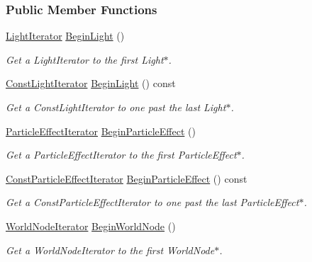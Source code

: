 \subsubsection*{Public Member Functions}
\begin{DoxyCompactItemize}
\item 
\hyperlink{classphys_1_1SceneManager_a2764b9082b4aecbf833c2f6e9f174ba0}{LightIterator} \hyperlink{classphys_1_1SceneManager_a710bed731b5674cae3bb09853f3a0cd1}{BeginLight} ()
\begin{DoxyCompactList}\small\item\em Get a LightIterator to the first Light$\ast$. \item\end{DoxyCompactList}\item 
\hyperlink{classphys_1_1SceneManager_a417c57b560317661d0c7d836a88f52ac}{ConstLightIterator} \hyperlink{classphys_1_1SceneManager_a468298df736ca62876592bf5e8ce36ac}{BeginLight} () const 
\begin{DoxyCompactList}\small\item\em Get a ConstLightIterator to one past the last Light$\ast$. \item\end{DoxyCompactList}\item 
\hyperlink{classphys_1_1SceneManager_a668ef8db2053cc15cc48b21fa6240c3e}{ParticleEffectIterator} \hyperlink{classphys_1_1SceneManager_a603f8cbd672cf081f869af4392c8cb4b}{BeginParticleEffect} ()
\begin{DoxyCompactList}\small\item\em Get a ParticleEffectIterator to the first ParticleEffect$\ast$. \item\end{DoxyCompactList}\item 
\hyperlink{classphys_1_1SceneManager_a0026f62b121b0d7010a67a79fdc9000c}{ConstParticleEffectIterator} \hyperlink{classphys_1_1SceneManager_a2289b4e4a5c4a3bc63480a1b7bbd70f4}{BeginParticleEffect} () const 
\begin{DoxyCompactList}\small\item\em Get a ConstParticleEffectIterator to one past the last ParticleEffect$\ast$. \item\end{DoxyCompactList}\item 
\hyperlink{classphys_1_1SceneManager_a67b62f6e9116423306b82e20cb2415fd}{WorldNodeIterator} \hyperlink{classphys_1_1SceneManager_a6fe8d95fd8989d93e0a47765dfa05049}{BeginWorldNode} ()
\begin{DoxyCompactList}\small\item\em Get a WorldNodeIterator to the first WorldNode$\ast$. \item\end{DoxyCompactList}\item 

\end{DoxyCompactItemize}
